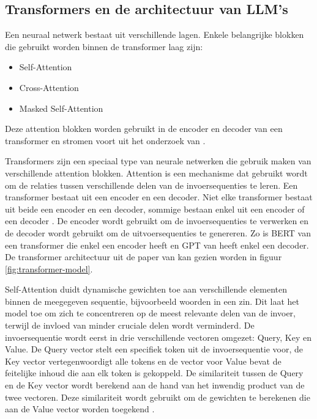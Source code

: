 \subsection{Transformers en de architectuur van LLM's}
\label{sec:architectuur-van-llms}
Een neuraal netwerk bestaat uit verschillende lagen. Enkele belangrijke blokken die gebruikt worden binnen de transformer laag zijn:
\begin{itemize}
  \item Self-Attention
  \item Cross-Attention
  \item Masked Self-Attention
\end{itemize}

Deze attention blokken worden gebruikt in de encoder en decoder van een transformer en stromen voort uit het onderzoek van \textcite{VaswaniEtAl2017}.

Transformers zijn een speciaal type van neurale netwerken die gebruik maken van verschillende attention blokken.
Attention is een mechanisme dat gebruikt wordt om de relaties tussen verschillende delen van de invoersequenties te leren.
Een transformer bestaat uit een encoder en een decoder. 
Niet elke transformer bestaat uit beide een encoder en een decoder, sommige bestaan enkel uit een encoder of een decoder \autocite{Hoque2023}.
De encoder wordt gebruikt om de invoersequenties te verwerken en de decoder wordt gebruikt om de uitvoersequenties te genereren.
Zo is BERT van \textcite{DevlinEtAl2019} een transformer die enkel een encoder heeft en GPT van \textcite{RandfordEtAL2018} heeft enkel een decoder.
De transformer architectuur uit de paper van \textcite{VaswaniEtAl2017} kan gezien worden in figuur \ref{fig:transformer-model}. 

Self-Attention duidt dynamische gewichten toe aan verschillende elementen binnen de meegegeven sequentie, bijvoorbeeld woorden in een zin.
Dit laat het model toe om zich te concentreren op de meest relevante delen van de invoer, terwijl de invloed van minder cruciale delen wordt verminderd.
De invoersequentie wordt eerst in drie verschillende vectoren omgezet: Query, Key en Value.
De Query vector stelt een specifiek token uit de invoersequentie voor, de Key vector vertegenwoordigt alle tokens en de vector voor Value bevat de feitelijke inhoud die aan elk token is gekoppeld.
De similariteit tussen de Query en de Key vector wordt berekend aan de hand van het inwendig product van de twee vectoren.
Deze similariteit wordt gebruikt om de gewichten te berekenen die aan de Value vector worden toegekend \autocite{VaswaniEtAl2017}.

